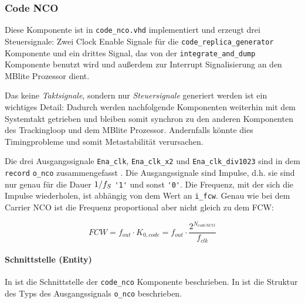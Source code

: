 \subsubsection{Code NCO}
Diese Komponente ist in  \lstinline$code_nco.vhd$ implementiert und erzeugt drei Steuersignale: Zwei Clock Enable Signale für die \lstinline$code_replica_generator$ Komponente und ein drittes Signal, das von der \lstinline$integrate_and_dump$ Komponente benutzt wird und außerdem zur Interrupt Signalisierung an den MBlite Prozessor dient.

Das keine \emph{Taktsignale}, sondern nur \emph{Steuersignale} generiert werden ist ein wichtiges Detail: Dadurch werden  nachfolgende Komponenten weiterhin mit dem Systemtakt getrieben und bleiben somit synchron zu den anderen Komponenten des Trackingloop und dem MBlite Prozessor. Andernfalls könnte dies Timingprobleme und somit Metastabilität verursachen.

Die drei Ausgangssignale \lstinline$Ena_clk$, \lstinline$Ena_clk_x2$ und \lstinline$Ena_clk_div1023$ sind in dem \lstinline$record$ \lstinline$o_nco$ zusammengefasst . Die Ausgangssignale sind Impulse, d.h. sie sind nur genau für die Dauer $1/f_S$ \lstinline$'1'$ und sonst \lstinline$'0'$. Die Frequenz, mit der sich die Impulse wiederholen, ist abhängig von dem Wert an \lstinline$i_fcw$. Genau wie bei dem Carrier NCO ist die Frequenz proportional aber nicht gleich zu dem \gls{FCW}:

\begin{equation}
    FCW=f_{out}\cdot K_{0,code} =f_{out}\cdot  \frac{2^{N_{codeNCO}}}{f_{clk}}
\end{equation}



\paragraph{Schnittstelle (Entity)}
In  ist die Schnittstelle der \lstinline$code_nco$ Komponente beschrieben. In  ist die Struktur des Typs des Ausgangssignals \lstinline$o_nco$ beschrieben.

